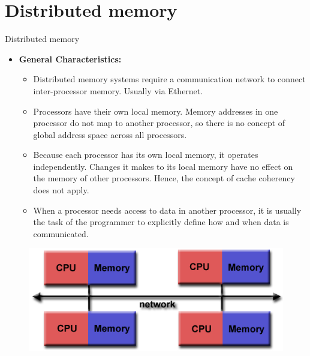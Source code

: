 \documentclass[10pt,times]{beamer}
\begin{document}
\section{Distributed memory}
\begin{frame}{Distributed memory}
\begin{itemize}
\item \textbf{General Characteristics:}
\begin{itemize}
\item Distributed memory systems require a communication network to 
connect inter-processor memory. Usually via Ethernet.

\item Processors have their own local memory. Memory addresses in one processor do 
not map to another processor, so there is no concept of global address space across 
all processors.

\item Because each processor has its own local memory, it operates independently. 
Changes it makes to its local memory have no effect on the memory of other     
processors. Hence, the concept of cache coherency does not apply.

\item When a processor needs access to data in another processor, it is usually the 
task of the programmer to explicitly define how and when data is communicated.

\end{itemize}

\end{itemize}
\begin{figure}
\includegraphics[width=0.5\linewidth]{figs/distributed_memory}
\end{figure}
\end{frame}
\end{document}
